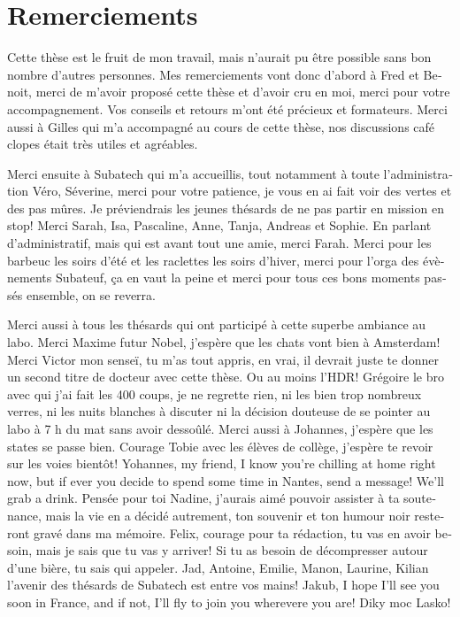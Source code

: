\documentclass[../main.tex]{subfiles}
\begin{document}
\chapter*{Remerciements}

\begin{otherlanguage}{french}
Cette thèse est le fruit de mon travail, mais n'aurait pu être possible sans bon nombre d'autres personnes. Mes remerciements vont donc d'abord à Fred et Benoit, merci de m'avoir proposé cette thèse et d'avoir cru en moi, merci pour votre accompagnement. Vos conseils et retours m'ont été précieux et formateurs. Merci aussi à Gilles qui m'a accompagné au cours de cette thèse, nos discussions café clopes était très utiles et agréables.

Merci ensuite à Subatech qui m'a accueillis, tout notamment à toute l'administration Véro, Séverine, merci pour votre patience, je vous en ai fait voir des vertes et des pas mûres. Je préviendrais les jeunes thésards de ne pas partir en mission en stop! Merci Sarah, Isa, Pascaline, Anne, Tanja, Andreas et Sophie. En parlant d'administratif, mais qui est avant tout une amie, merci Farah. Merci pour les barbeuc les soirs d'été et les raclettes les soirs d'hiver, merci pour l'orga des évènements Subateuf, ça en vaut la peine et merci pour tous ces bons moments passés ensemble, on se reverra.

Merci aussi à tous les thésards qui ont participé à cette superbe ambiance au labo. Merci Maxime futur Nobel, j'espère que les chats vont bien à Amsterdam! Merci Victor mon senseï, tu m'as tout appris, en vrai, il devrait juste te donner un second titre de docteur avec cette thèse. Ou au moins l'HDR!
Grégoire le bro avec qui j'ai fait les 400 coups, je ne regrette rien, ni les bien trop nombreux verres, ni les nuits blanches à discuter ni la décision douteuse de se pointer au labo à 7 h du mat sans avoir dessoûlé. Merci aussi à Johannes, j'espère que les states se passe bien.
Courage Tobie avec les élèves de collège, j'espère te revoir sur les voies bientôt! Yohannes, my friend, I know you're chilling at home right now, but if ever you decide to spend some time in Nantes, send a message! We'll grab a drink.
Pensée pour toi Nadine, j'aurais aimé pouvoir assister à ta soutenance, mais la vie en a décidé autrement, ton souvenir et ton humour noir resteront gravé dans ma mémoire.
Felix, courage pour ta rédaction, tu vas en avoir besoin, mais je sais que tu vas y arriver! Si tu as besoin de décompresser autour d'une bière, tu sais qui appeler.
Jad, Antoine, Emilie, Manon, Laurine, Kilian l'avenir des thésards de Subatech est entre vos mains! Jakub, I hope I'll see you soon in France, and if not, I'll fly to join you wherevere you are! Diky moc Lasko!


\end{otherlanguage}
\end{document}

